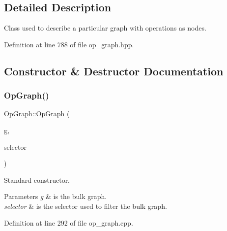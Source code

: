 \subsection{Detailed Description}
Class used to describe a particular graph with operations as nodes. 

Definition at line 788 of file op\+\_\+graph.\+hpp.



\subsection{Constructor \& Destructor Documentation}
\mbox{\label{structOpGraph_ad33a9474567bc8dc3eaaf1c010f5903e}} 
\subsubsection{\texorpdfstring{Op\+Graph()}{OpGraph()}\hspace{0.1cm}{\footnotesize\ttfamily [1/2]}}
{\footnotesize\ttfamily Op\+Graph\+::\+Op\+Graph (\begin{DoxyParamCaption}\item[{const \hyperlink{op__graph_8hpp_a6a9918dc96f448814ad35759f9460ed7}{Op\+Graphs\+Collection\+Ref}}]{g,  }\item[{int}]{selector }\end{DoxyParamCaption})}



Standard constructor. 


\begin{DoxyParams}{Parameters}
{\em g} & is the bulk graph. \\
\hline
{\em selector} & is the selector used to filter the bulk graph. \\
\hline
\end{DoxyParams}


Definition at line 292 of file op\+\_\+graph.\+cpp.

\mbox{\label{structOpGraph_a2bcc85b20d650908aeb085f510f52309}} 
